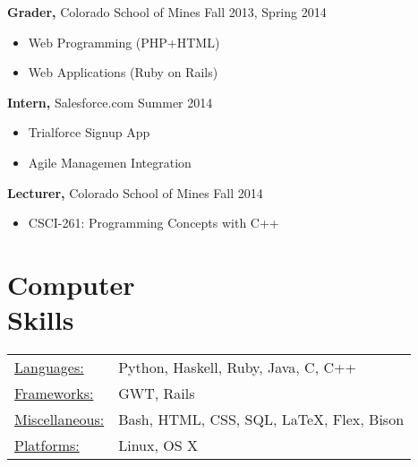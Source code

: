 \documentclass[12pt]{res}
\begin{document}
\begin{resume}
{\bf Grader,} Colorado School of Mines \hfill Fall 2013, Spring 2014
\begin{itemize} \itemsep -2pt
    \item Web Programming (PHP+HTML)
    \item Web Applications (Ruby on Rails)
\end{itemize}

{\bf Intern,} Salesforce.com \hfill Summer 2014
\begin{itemize} \itemsep -2pt
    \item Trialforce Signup App
    \item Agile Managemen Integration
\end{itemize}

{\bf Lecturer,} Colorado School of Mines \hfill Fall 2014
\begin{itemize} \itemsep -2pt
    \item CSCI-261: Programming Concepts with C++
\end{itemize}

\section{Computer \\ Skills}
\begin{tabular}{l p{4in}}
    \underline{Languages:} & Python, Haskell, Ruby, Java, C, C++ \\
    \underline{Frameworks:} & GWT, Rails \\
    \underline{Miscellaneous:} & Bash, HTML, CSS, SQL, \LaTeX, Flex, Bison \\
    \underline{Platforms:} & Linux, OS X
 \end{tabular}

\end{resume}
\end{document}
